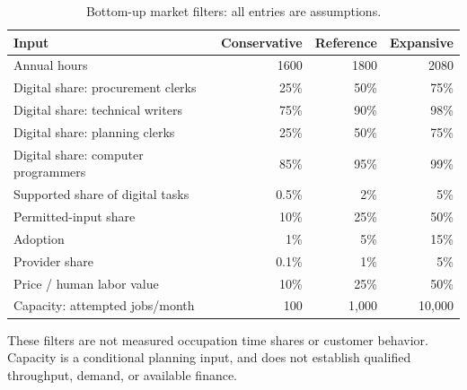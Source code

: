 \begin{table}[tbp]
\centering\small
\caption{Bottom-up market filters: all entries are assumptions.}
\label{tab:ec-market-assumptions}
\begin{tabular}{lrrr}
\toprule
Input & Conservative & Reference & Expansive \\
\midrule
Annual hours & 1600 & 1800 & 2080 \\
Digital share: procurement clerks & 25\% & 50\% & 75\% \\
Digital share: technical writers & 75\% & 90\% & 98\% \\
Digital share: planning clerks & 25\% & 50\% & 75\% \\
Digital share: computer programmers & 85\% & 95\% & 99\% \\
Supported share of digital tasks & 0.5\% & 2\% & 5\% \\
Permitted-input share & 10\% & 25\% & 50\% \\
Adoption & 1\% & 5\% & 15\% \\
Provider share & 0.1\% & 1\% & 5\% \\
Price / human labor value & 10\% & 25\% & 50\% \\
Capacity: attempted jobs/month & 100 & 1,000 & 10,000 \\
\bottomrule
\end{tabular}
\par\smallskip\begin{minipage}{0.97\linewidth}\footnotesize These filters are not measured occupation time shares or customer behavior. Capacity is a conditional planning input, and does not establish qualified throughput, demand, or available finance.
\end{minipage}
\end{table}

